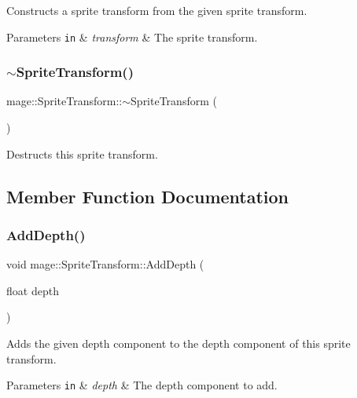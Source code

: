 Constructs a sprite transform from the given sprite transform.


\begin{DoxyParams}[1]{Parameters}
\mbox{\tt in}  & {\em transform} & The sprite transform. \\
\hline
\end{DoxyParams}
\hypertarget{structmage_1_1_sprite_transform_a14a3614023996cbb071c3de99f9528bc}{}\label{structmage_1_1_sprite_transform_a14a3614023996cbb071c3de99f9528bc} 
\subsubsection{\texorpdfstring{$\sim$\+Sprite\+Transform()}{~SpriteTransform()}}
{\footnotesize\ttfamily mage\+::\+Sprite\+Transform\+::$\sim$\+Sprite\+Transform (\begin{DoxyParamCaption}{ }\end{DoxyParamCaption})\hspace{0.3cm}{\ttfamily [default]}}

Destructs this sprite transform. 

\subsection{Member Function Documentation}
\hypertarget{structmage_1_1_sprite_transform_a9865d77d9c2e02758b1466423c12bcc2}{}\label{structmage_1_1_sprite_transform_a9865d77d9c2e02758b1466423c12bcc2} 
\subsubsection{\texorpdfstring{Add\+Depth()}{AddDepth()}}
{\footnotesize\ttfamily void mage\+::\+Sprite\+Transform\+::\+Add\+Depth (\begin{DoxyParamCaption}\item[{float}]{depth }\end{DoxyParamCaption})}

Adds the given depth component to the depth component of this sprite transform.


\begin{DoxyParams}[1]{Parameters}
\mbox{\tt in}  & {\em depth} & The depth component to add. \\
\hline
\end{DoxyParams}
\hypertarget{structmage_1_1_sprite_transform_a0a24823966ff906791ae598ac4248d03}{}\label{structmage_1_1_sprite_transform_a0a24823966ff906791ae598ac4248d03} 
